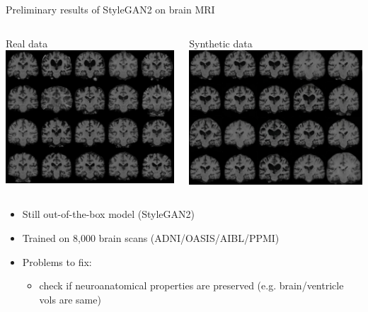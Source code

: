 \documentclass[8pt,xcolor=table,aspectratio=169]{beamer}
\begin{document}
\begin{frame}{Preliminary results of StyleGAN2 on brain MRI}
\begin{columns}
\begin{column}{0.5\textwidth}
\centering
Real data
\includegraphics[width=\textwidth]{samY1tk.jpg}
\end{column}
\begin{column}{0.5\textwidth}
\centering
Synthetic data
\includegraphics[width=\textwidth]{JvsDI4X.jpg} 
\end{column}
\end{columns}

\begin{itemize}
\item Still out-of-the-box model (StyleGAN2)
\item Trained on 8,000 brain scans (ADNI/OASIS/AIBL/PPMI)
\item Problems to fix:
  \begin{itemize}
  \item check if neuroanatomical properties are preserved (e.g. brain/ventricle vols are same)
  \end{itemize}
\end{itemize}
\vspace{1em}

\end{frame}
\end{document}
